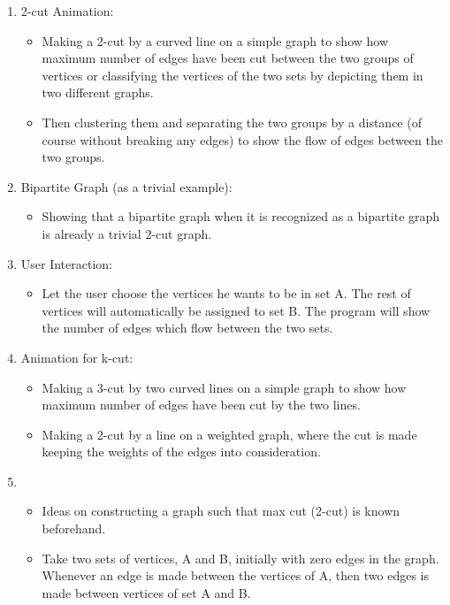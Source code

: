 \begin{enumerate}
\def\labelenumi{\arabic{enumi}.}
\item
  2-cut Animation:

  \begin{itemize}
  \tightlist
  \item
    Making a 2-cut by a curved line on a simple graph to show how
    maximum number of edges have been cut between the two groups of
    vertices or classifying the vertices of the two sets by depicting
    them in two different graphs.
  \item
    Then clustering them and separating the two groups by a distance (of
    course without breaking any edges) to show the flow of edges between
    the two groups.
  \end{itemize}
\item
  Bipartite Graph (as a trivial example):

  \begin{itemize}
  \tightlist
  \item
    Showing that a bipartite graph when it is recognized as a bipartite
    graph is already a trivial 2-cut graph.
  \end{itemize}
\item
  User Interaction:

  \begin{itemize}
  \tightlist
  \item
    Let the user choose the vertices he wants to be in set A. The rest
    of vertices will automatically be assigned to set B. The
    program will show the number of edges which flow between the two
    sets.
  \end{itemize}
\item
  Animation for k-cut:

  \begin{itemize}
  \tightlist
  \item
    Making a 3-cut by two curved lines on a simple graph to show how
    maximum number of edges have been cut by the two lines.
  \item
    Making a 2-cut by a line on a weighted graph, where the cut is made
    keeping the weights of the edges into consideration.
  \end{itemize}
\item
  \begin{itemize}
  \tightlist
  \item
    Ideas on constructing a graph such that max cut (2-cut) is known
    beforehand.
  \item
    Take two sets of vertices, A and B, initially with zero edges in the
    graph. Whenever an edge is made between the vertices of A, then two
    edges is made between vertices of set A and B.
  \end{itemize}
\end{enumerate}

